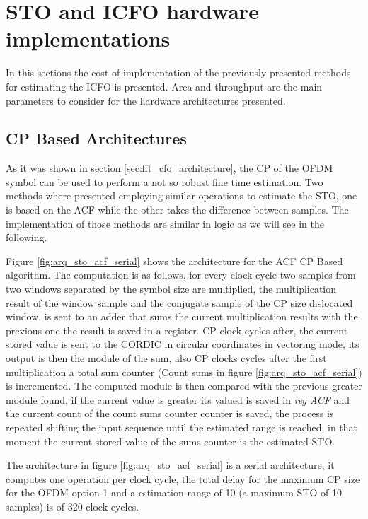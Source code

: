 \section{STO and ICFO hardware implementations}

In this sections the cost of implementation of the previously presented methods for estimating the ICFO is presented. Area and throughput are the main parameters to consider for the hardware architectures presented.


\subsection{CP Based Architectures}
As it was shown in section \ref{sec:fft_cfo_architecture}, the CP of the OFDM symbol can be used to perform a not so robust fine time estimation. Two methods where presented employing similar operations to estimate the STO, one is based on the ACF while the other takes the difference between samples. The implementation of those methods are similar in logic as we will see in the following. 


Figure \ref{fig:arq_sto_acf_serial} shows the architecture for the ACF CP Based algorithm. The computation is as follows, for every clock cycle two samples from two windows separated by the symbol size are multiplied, the multiplication result of the window sample and the conjugate sample of the CP size dislocated window, is sent to an adder that sums the current multiplication results with the previous one the result is saved in a register. CP clock cycles after, the current stored value is sent to the CORDIC in circular coordinates in vectoring mode, its output is then the module of the sum, also CP clocks cycles after the first multiplication a total sum counter (Count sums in figure \ref{fig:arq_sto_acf_serial}) is incremented. The computed module is then compared with the previous greater module found, if the current value is greater its valued is saved in \emph{reg ACF} and the current count of the count sums counter counter is saved, the process is repeated shifting the input sequence until the estimated range is reached, in that moment the current stored value of the sums counter is the estimated STO. 

The architecture in figure \ref{fig:arq_sto_acf_serial} is a serial architecture, it computes one operation per clock cycle, the total delay for the maximum CP size for the OFDM option 1 and a estimation range of 10 (a maximum STO of 10 samples) is of 320 clock cycles. 

